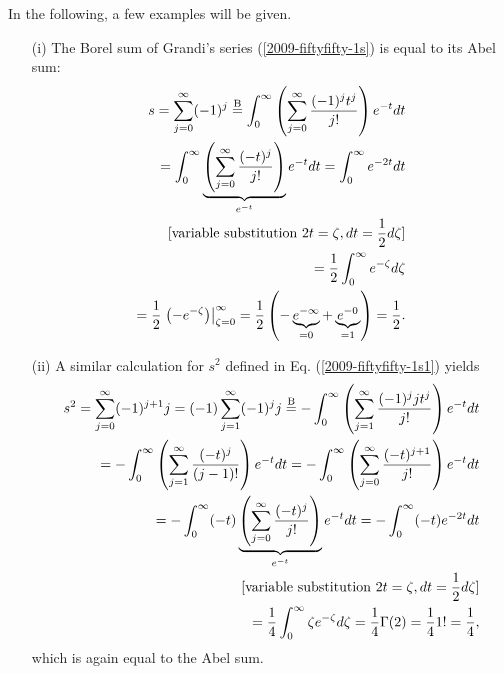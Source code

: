 {
\color{blue}
\bexample

In the following, a few examples will be given.

\begin{itemize}
\item[(i)]
The Borel sum
of Grandi's series (\ref{2009-fiftyfifty-1s})
is equal to its Abel sum:
\begin{equation}
\begin{split}
s= \sum_{j=0}^\infty (-1)^j
\stackrel{{\rm B}}{=}
\int_0^\infty \left(\sum_{j=0}^\infty   \frac{(-1)^j t^j}{j!}\right)   e^{-t} dt  \\
=
\int_0^\infty \underbrace{\left(\sum_{j=0}^\infty   \frac{(- t)^j}{j!}\right)}_{e^{-t}}   e^{-t} dt
=
\int_0^\infty    e^{-2t} dt  \\
[\textrm{variable substitution } 2t = \zeta, dt = \frac{1}{2} d \zeta ]\\
=
\frac{1}{2}
\int_0^\infty    e^{-\zeta } d\zeta      \\
=
\frac{1}{2}
\left.     \left(-e^{-\zeta }\right) \right|_{\zeta=0}^\infty
=
\frac{1}{2} \left(- \underbrace{e^{-\infty}}_{=0} + \underbrace{e^{-0}}_{=1}\right) = \frac{1}{2}
.
\end{split}
\end{equation}


\item[(ii)]
A similar calculation for $s^2$ defined in Eq.
(\ref{2009-fiftyfifty-1s1})
yields
\begin{equation}
\begin{split}
s^2= \sum_{j=0}^\infty (-1)^{j+1} j = (-1) \sum_{j=1}^\infty (-1)^j j
\stackrel{{\rm B}}{=}
-\int_0^\infty \left(\sum_{j=1}^\infty   \frac{(-1)^j j t^j}{j!}\right)   e^{-t} dt  \\
=
-\int_0^\infty \left(\sum_{j=1}^\infty   \frac{(-t)^j}{(j-1)!}\right)   e^{-t} dt
=
-\int_0^\infty \left(\sum_{j=0}^\infty   \frac{(-t)^{j+1}}{j!}\right)   e^{-t} dt  \\
=
-\int_0^\infty (-t) \underbrace{\left(\sum_{j=0}^\infty   \frac{(-t)^j}{j!}\right)}_{e^{-t}}   e^{-t} dt
=
-\int_0^\infty  (-t)  e^{-2t} dt  \\
[\textrm{variable substitution } 2t = \zeta, dt = \frac{1}{2} d \zeta ]\\
=
\frac{1}{4}
\int_0^\infty  \zeta  e^{-\zeta } d\zeta
=
\frac{1}{4}
\Gamma (2)
=
\frac{1}{4} 1! = \frac{1}{4}
,
\end{split}
\end{equation}
which is again equal to the Abel sum.


\end{itemize}}
